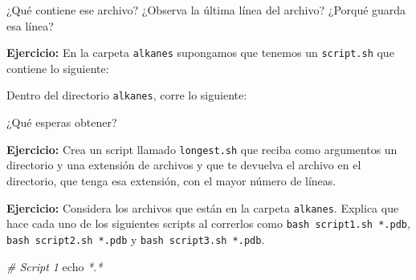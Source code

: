 \documentclass[
]{book}
\newenvironment{Shaded}{\begin{snugshade}}{\end{snugshade}}
\newcommand{\AttributeTok}[1]{\textcolor[rgb]{0.13,0.29,0.53}{#1}}
\newcommand{\BuiltInTok}[1]{#1}
\newcommand{\CommentTok}[1]{\textcolor[rgb]{0.56,0.35,0.01}{\textit{#1}}}
\newcommand{\ExtensionTok}[1]{#1}
\newcommand{\FunctionTok}[1]{\textcolor[rgb]{0.13,0.29,0.53}{\textbf{#1}}}
\newcommand{\KeywordTok}[1]{\textcolor[rgb]{0.13,0.29,0.53}{\textbf{#1}}}
\newcommand{\NormalTok}[1]{#1}
\newcommand{\OperatorTok}[1]{\textcolor[rgb]{0.81,0.36,0.00}{\textbf{#1}}}
\newcommand{\PreprocessorTok}[1]{\textcolor[rgb]{0.56,0.35,0.01}{\textit{#1}}}
\newcommand{\StringTok}[1]{\textcolor[rgb]{0.31,0.60,0.02}{#1}}
\newcommand{\VariableTok}[1]{\textcolor[rgb]{0.00,0.00,0.00}{#1}}
\begin{document}
\begin{Shaded}
\end{Shaded}

¿Qué contiene ese archivo? ¿Observa la última línea del archivo? ¿Porqué guarda esa línea?

\textbf{Ejercicio:} En la carpeta \texttt{alkanes} supongamos que tenemos un \texttt{script.sh} que contiene lo siguiente:

\begin{Shaded}
\end{Shaded}

Dentro del directorio \texttt{alkanes}, corre lo siguiente:

\begin{Shaded}
\end{Shaded}

¿Qué esperas obtener?

\textbf{Ejercicio:} Crea un script llamado \texttt{longest.sh} que reciba como argumentos un directorio y una extensión de archivos y que te devuelva el archivo en el directorio, que tenga esa extensión, con el mayor número de líneas.

\textbf{Ejercicio:} Considera los archivos que están en la carpeta \texttt{alkanes}. Explica que hace cada uno de los siguientes scripts al correrlos como \texttt{bash\ script1.sh\ *.pdb}, \texttt{bash\ script2.sh\ *.pdb} y \texttt{bash\ script3.sh\ *.pdb}.

\begin{Shaded}
\begin{Highlighting}[]
\CommentTok{\# Script 1}
\BuiltInTok{echo} \PreprocessorTok{*}\NormalTok{.}\PreprocessorTok{*}
\end{Highlighting}
\end{Shaded}
\end{document}
